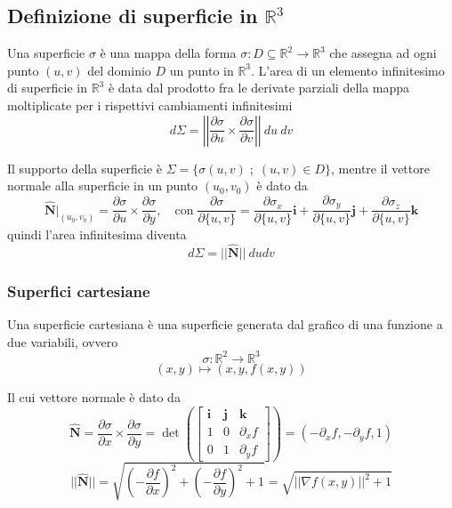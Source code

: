     \subsection{Definizione di superficie in \texorpdfstring{$\mathbb{R}^{3}$}{R3}}
        Una superficie $\sigma$ è una mappa della forma $\sigma: D \subseteq \mathbb{R}^{2} \rightarrow \mathbb{R}^{3}$ che assegna ad ogni punto $(u, v)$ del dominio $D$ un punto in $\mathbb{R}^{3}$.
        L'area di un elemento infinitesimo di superficie in $\mathbb{R}^{3}$ è data dal prodotto fra le derivate parziali della mappa moltiplicate per i rispettivi cambiamenti infinitesimi
        \[
            d\Sigma = \left|\left| \frac{\partial \sigma}{\partial u} \times \frac{\partial \sigma}{\partial v} \right|\right| \: du \: dv
        \]

        Il supporto della superficie è $\Sigma = \{ \sigma(u, v) \; ; \; (u, v) \in D \}$, mentre il vettore normale alla superficie in un punto $(u_{0}, v_{0})$ è dato da
        \[
            \mathbf{\hat{N}}|_{(u_{0}, v_{0})} = \frac{\partial \sigma}{\partial u} \times \frac{\partial \sigma}{\partial y}, \quad \text{con} \; \frac{\partial \sigma}{\partial \{u, v\}} = \frac{\partial \sigma_{x}}{\partial \{u, v\}} \mathbf{i} + \frac{\partial \sigma_{y}}{\partial \{u, v\}} \mathbf{j} + \frac{\partial \sigma_{z}}{\partial \{u, v\}} \mathbf{k}
        \]
        quindi l'area infinitesima diventa
        \[
            d\Sigma = ||\mathbf{\hat{N}}|| \: du dv
        \]

        \subsubsection{Superfici cartesiane}
            Una superficie cartesiana è una superficie generata dal grafico di una funzione a due variabili, ovvero
            \[
                \sigma: \mathbb{R}^{2} \rightarrow \mathbb{R}^{3}
            \]
            \[
                (x, y) \mapsto (x, y, f(x, y))
            \]

            Il cui vettore normale è dato da
            \[
                \mathbf{\hat{N}} = \frac{\partial \sigma}{\partial x} \times \frac{\partial \sigma}{\partial y} = \det\left( \begin{bmatrix}
                    \mathbf{i} & \mathbf{j} & \mathbf{k} \\
                    1 & 0 & \partial_{x} f \\
                    0 & 1 & \partial_{y} f
                \end{bmatrix}\right) = (-\partial_{x} f, -\partial_{y} f, 1)
            \]
            \[
                ||\mathbf{\hat{N}}|| = \sqrt{\displaystyle \left( -\frac{\partial f}{\partial x} \right)^{2} + \left( -\frac{\partial f}{\partial y} \right)^{2} + 1} = \sqrt{||\nabla f(x, y)||^{2} + 1}
            \]

